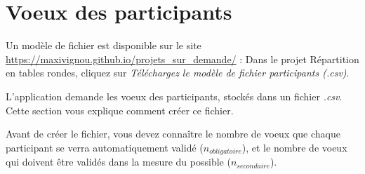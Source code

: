 \documentclass[11pt,a4paper]{article}
\newcommand{\nomproduit}{Répartition en tables rondes}
\begin{document}
\section{Voeux des participants}
\label{sec:voeux}
\begin{note}
Un modèle de fichier est disponible sur le site \url{https://maxivignou.github.io/projets_sur_demande/} : Dans le projet \nomproduit{}, cliquez sur \textit{Téléchargez le modèle de fichier participants (.csv)}.
\end{note}
L'application demande les voeux des participants, stockés dans un fichier \textit{.csv}. Cette section vous explique comment créer ce fichier.
\begin{astuce}
Avant de créer le fichier, vous devez connaître le nombre de voeux que chaque participant se verra automatiquement validé ($n_{obligatoire}$), et le nombre de voeux qui doivent être validés dans la mesure du possible ($n_{secondaire}$).
\end{astuce}
\end{document}

